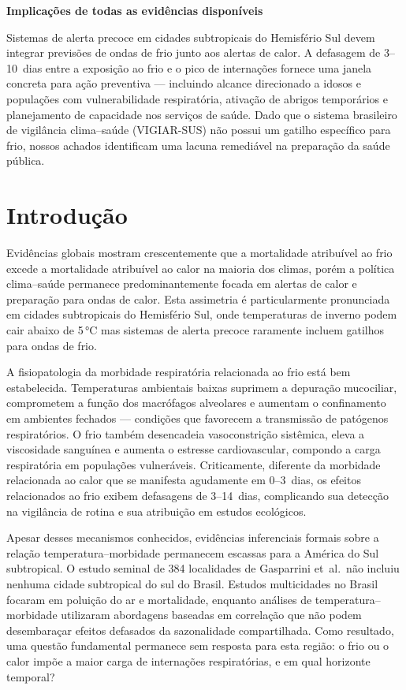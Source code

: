 \documentclass[12pt]{article}
\begin{document}
\textbf{Implicações de todas as evidências disponíveis}

Sistemas de alerta precoce em cidades subtropicais do Hemisfério Sul
devem integrar previsões de ondas de frio junto aos alertas de calor.
A defasagem de 3--10~dias entre a exposição ao frio e o pico de
internações fornece uma janela concreta para ação preventiva ---
incluindo alcance direcionado a idosos e populações com
vulnerabilidade respiratória, ativação de abrigos temporários e
planejamento de capacidade nos serviços de saúde. Dado que o sistema
brasileiro de vigilância clima--saúde (VIGIAR-SUS) não possui um
gatilho específico para frio, nossos achados identificam uma lacuna
remediável na preparação da saúde pública.


\section{Introdução}

Evidências globais mostram crescentemente que a mortalidade atribuível
ao frio excede a mortalidade atribuível ao calor na maioria dos
climas, porém a política clima--saúde permanece predominantemente
focada em alertas de calor e preparação para ondas de calor. Esta
assimetria é particularmente pronunciada em cidades subtropicais do
Hemisfério Sul, onde temperaturas de inverno podem cair abaixo de
5\,°C mas sistemas de alerta precoce raramente incluem gatilhos para
ondas de frio.

A fisiopatologia da morbidade respiratória relacionada ao frio está
bem estabelecida. Temperaturas ambientais baixas suprimem a depuração
mucociliar, comprometem a função dos macrófagos alveolares e aumentam
o confinamento em ambientes fechados --- condições que favorecem a
transmissão de patógenos respiratórios. O frio também desencadeia
vasoconstrição sistêmica, eleva a viscosidade sanguínea e aumenta o
estresse cardiovascular, compondo a carga respiratória em populações
vulneráveis. Criticamente, diferente da morbidade relacionada ao calor
que se manifesta agudamente em 0--3~dias, os efeitos relacionados ao
frio exibem defasagens de 3--14~dias, complicando sua detecção na
vigilância de rotina e sua atribuição em estudos ecológicos.

Apesar desses mecanismos conhecidos, evidências inferenciais formais
sobre a relação temperatura--morbidade permanecem escassas para a
América do Sul subtropical. O estudo seminal de 384 localidades de
Gasparrini et~al.\ não incluiu nenhuma cidade subtropical do sul do
Brasil. Estudos multicidades no Brasil focaram em poluição do ar e
mortalidade, enquanto análises de temperatura--morbidade utilizaram
abordagens baseadas em correlação que não podem desembaraçar efeitos
defasados da sazonalidade compartilhada. Como resultado, uma questão
fundamental permanece sem resposta para esta região: o frio ou o calor
impõe a maior carga de internações respiratórias, e em qual horizonte
temporal?
\end{document}
